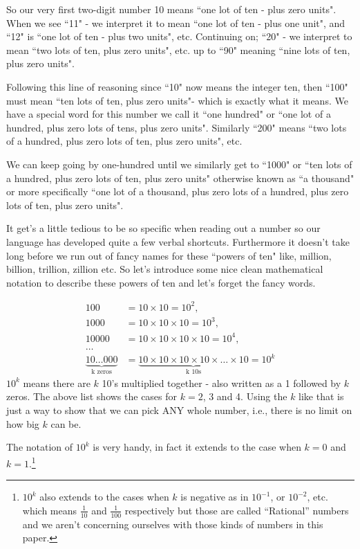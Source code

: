 \documentclass{article}
\begin{document}
So our very first two-digit number 10 means ``one lot of ten - plus zero units".
When we see ``11" - we interpret it to mean ``one lot of ten - plus one unit",
and ``12" is ``one lot of ten - plus two units", etc.
Continuing on; ``20" - we interpret to mean ``two lots of ten,
plus zero units", etc. up to ``90" meaning ``nine lots of ten,
plus zero units".

Following this line of reasoning since ``10" now means the integer ten,
then ``100" must mean ``ten lots of ten,
plus zero units"- which is exactly what it means.
We have a special word for this number we call it ``one hundred" or ``one lot of a hundred,
plus zero lots of tens, plus zero units".
Similarly ``200" means ``two lots of a hundred, plus zero lots of ten,
plus zero units", etc.

We can keep going by one-hundred until we similarly get to ``1000" or ``ten lots of a hundred,
plus zero lots of ten, plus zero units" otherwise known
as ``a thousand" or more specifically ``one lot of a thousand,
plus zero lots of a hundred, plus zero lots of ten, plus zero units".

It get's a little tedious to be so specific when reading out
a number so our language has developed quite a few verbal shortcuts.
Furthermore it doesn't take long before we run out of fancy names
for these ``powers of ten" like, million, billion, trillion,
zillion etc. So let's introduce some nice clean mathematical notation
to describe these powers of ten and let's forget the fancy words.

\begin{align*}
100&=10\times10=10^2,\\
1000&= 10\times10\times10=10^3,\\
10000&= 10\times10\times10\times10=10^4,\\
\dots{}\\
\underbrace{10\dots{}000}_\text{k zeros}&= \underbrace{10\times10\times10\times10\times\dots{}\times10}_\text{k 10s}=10^k
\end{align*}
$10^k$ means there are $k$ 10's multiplied together - 
also written as a 1 followed by $k$ zeros.
The above list shows the cases for $k = 2$, 3 and 4.
Using the $k$ like that is just a way to show that we can pick ANY whole number,
i.e., there is no limit on how big $k$ can be.

The notation of $10^k$ is very handy, in fact it extends
to the case when $k=0$ and $k=1$.\footnote{$10^k$ also extends to the cases
when $k$ is negative as in $10^{-1}$, or $10^{-2}$, etc. which means $\frac{1}{10}$ and $\frac{1}{100}$ respectively
but those are called ``Rational'' numbers and we aren't concerning ourselves with those kinds of numbers in this paper.}
\end{document}
